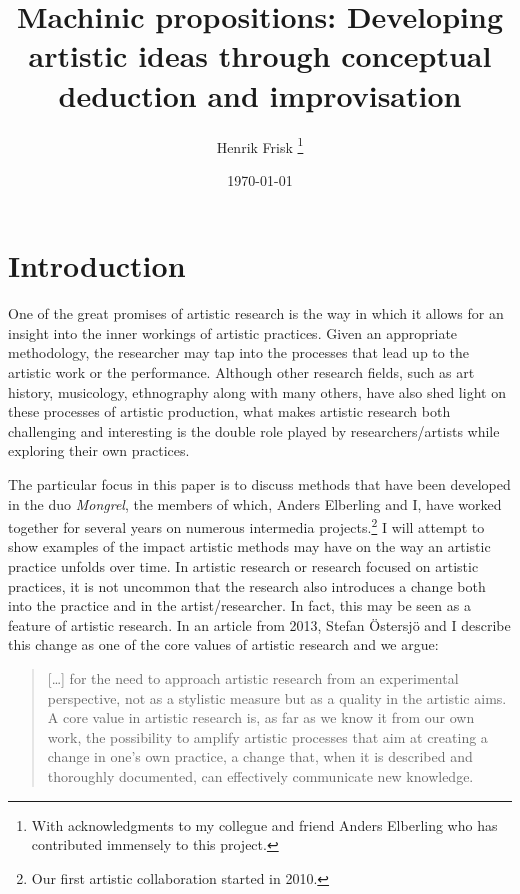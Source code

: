 \documentclass[11pt]{article}
\author{Henrik Frisk \thanks{With acknowledgments to my collegue and
    friend Anders Elberling who has contributed immensely to this project.}}
\date{\today}
\title{Machinic propositions: Developing artistic ideas through conceptual deduction and improvisation}
\begin{document}
\maketitle


\section*{Introduction}
\label{sec:introduction}

One of the great promises of artistic research is the way in which it
allows for an insight into the inner workings of artistic
practices. Given an appropriate methodology, the researcher may tap
into the processes that lead up to the artistic work or the
performance. Although other research fields, such as art history,
musicology, ethnography along with many others, have also shed light
on these processes  of artistic production, what makes
artistic research both challenging and interesting is the double role
played by researchers/artists while exploring their own practices.


The particular focus in this paper is to discuss methods that have
been developed in the duo \emph{Mongrel}, the members of which, Anders
Elberling and I, have worked together for several years on
numerous intermedia projects.\footnote{Our first artistic
  collaboration started in 2010.} I will attempt to show examples
of the impact artistic methods may have on the way an artistic
practice unfolds over time. In artistic research or research focused
on artistic practices, it is not uncommon that the research also
introduces a change both into the practice and in the
artist/researcher. In fact, this may be seen as a feature of artistic
research. In an article from 2013, Stefan Östersjö and I describe this
change as one of the core values of artistic research and we argue: 

\begin{quote} [\ldots] for the need to approach artistic research from
  an experimental perspective, not as a stylistic measure but as a
  quality in the artistic aims. A core value in artistic research is,
  as far as we know it from our own work, the possibility to amplify
  artistic processes that aim at creating a change in one’s own
  practice, a change that, when it is described and thoroughly
  documented, can effectively communicate new
  knowledge. \citep[][p. 27]{frisk-ost13}
\end{quote}
\end{document}
